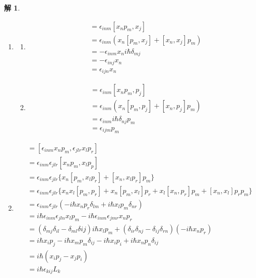 \documentclass{article}
\newtheorem{solution}{解}
\begin{document}
\begin{solution}
    \begin{enumerate}
        \item
        \begin{enumerate}
            \item[(a)] 
            \begin{align*}
                [L_i,x_j]&=\epsilon_{inm}[x_np_m,x_j]\\
                &=\epsilon_{inm}\left(x_n[p_m,x_j]+[x_n,x_j]p_m\right)\\
                &=-\epsilon_{inm}x_ni\hbar\delta_{mj}\\
                &=-\epsilon_{inj}x_n\\
                &=\epsilon_{ijn}x_n
            \end{align*}
            \item[(b)] 
            \begin{align*}
                [L_i,p_j]&=\epsilon_{inm}[x_np_m,p_j]\\
                &=\epsilon_{inm}\left(x_n[p_m,p_j]+[x_n,p_j]p_m\right)\\
                &=\epsilon_{inm}i\hbar \delta_{nj}p_m\\
                &=\epsilon_{ijm}p_m
            \end{align*}
        \end{enumerate}
        \item 
        \begin{align*}
            [L_i,L_j]&=[\epsilon_{inm}x_np_m,\epsilon_{jlr}x_lp_r]\\
            &=\epsilon_{inm}\epsilon_{jlr}[x_np_m,x_lp_p]\\
            &=\epsilon_{inm}\epsilon_{jlr}\{x_n[p_m,x_lp_r]+[x_n,x_lp_r]p_m\}\\
            &=\epsilon_{inm}\epsilon_{jlr}\{x_nx_l[p_m,p_r]+x_n[p_m,x_l]p_r+x_l[x_n,p_r]p_m+[x_n,x_l]p_rp_m\}\\
            &=\epsilon_{inm}\epsilon_{jlr}\left(-i\hbar x_np_r\delta_{lm}+i\hbar x_lp_m\delta_{nr}\right)\\
            &=i\hbar\epsilon_{inm}\epsilon_{jln}x_lp_m-i\hbar\epsilon_{inm}\epsilon_{jmr}x_np_r\\
            &=(\delta_{mj}\delta_{il}-\delta_{ml}\delta{ij})i\hbar x_lp_m+(\delta_{ir}\delta_{nj}-\delta_{ij}\delta_{rn})(-i\hbar x_np_r)\\
            &=i\hbar x_ip_j-i\hbar x_mp_m\delta_{ij}-i\hbar x_ip_i+i\hbar x_np_n\delta_{ij}\\
            &=i\hbar(x_ip_j-x_jp_i)\\
            &=i\hbar\epsilon_{kij}L_k
        \end{align*}
    \end{enumerate}
\end{solution}
\end{document}
